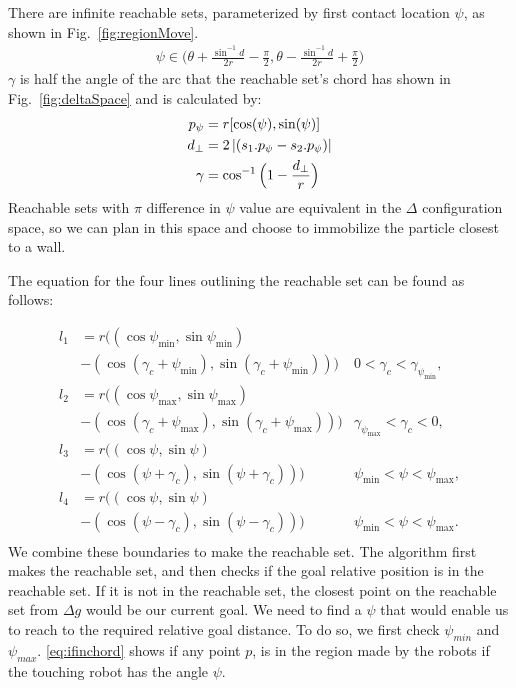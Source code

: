 There are infinite reachable sets, parameterized by first contact location $\psi$, as shown in Fig.~\ref{fig:regionMove}.
\begin{align}
 \psi \in \Big(\theta +\frac{\sin^{-1}{d}}{2r} - \frac{\pi}{2}, \theta -\frac{\sin^{-1}{d}}{2r} + \frac{\pi}{2}\Big)
\end{align}
$\gamma$ is half the angle of the arc that the reachable set's chord has shown in Fig.~\ref{fig:deltaSpace} and is calculated by:
\begin{align}
p_\psi &= r[\cos(\psi ), \sin(\psi )]\\
d_\perp&= 2 \left\lvert(s_1.p_\psi - s_2.p_\psi)\right\rvert\\
\gamma &= \cos^{-1} \Big(1-\frac{d_\perp}{r} \Big)
\end{align}
Reachable sets with $\pi$ difference in $\psi$ value are equivalent in the  $\Delta$ configuration space, so we can plan in this space and choose to immobilize the particle closest to a wall. 

The equation for the four lines outlining the reachable set can be found as follows:

\begin{align}\label{eq:circlereachable}
l_1 &=  r \Big((\cos\psi_{\min}, \sin\psi_{\min})\\ \nonumber
& - (\cos(\gamma_c + \psi_{\min}), \sin(\gamma_c + \psi_{\min}))\Big) &  0<\gamma_c< \gamma_{\psi_{\min}},\\ \nonumber
l_2 &=  r \Big((\cos\psi_{\max}, \sin\psi_{\max})\\ \nonumber
& - (\cos(\gamma_c + \psi_{\max}), \sin(\gamma_c + \psi_{\max}))\Big) &  \gamma_{\psi_{\max}}<\gamma_c< 0,\\  \nonumber
l_3 &=  r \Big((\cos\psi, \sin\psi)\\ \nonumber
& - (\cos( \psi+\gamma_c ), \sin( \psi+ \gamma_c))\Big) &  \psi_{\min}<\psi< \psi_{\max},\\ \nonumber
l_4 &=  r \Big((\cos\psi, \sin\psi)\\ \nonumber
& - (\cos( \psi-\gamma_c ), \sin( \psi- \gamma_c))\Big) &  \psi_{\min}<\psi< \psi_{\max}.\\ \nonumber
\end{align}
We combine these boundaries to make the reachable set. 
The algorithm first makes the reachable set, and then checks if the goal relative position is in the reachable set. If it is not in the reachable set, the closest point on the reachable set from $\Delta g$ would be our current goal. We need to find a $\psi$ that would enable us to reach to the required relative goal distance. To do so, we first check $\psi_{min}$ and $\psi_{max}$. \eqref{eq:ifinchord} shows if any point $p$, is in the region made by the robots if the touching robot has the angle $\psi$.

